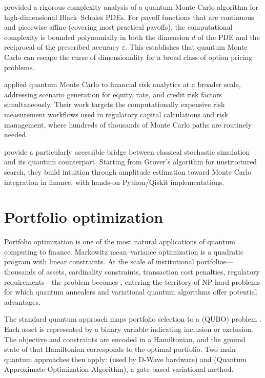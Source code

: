 \citet{chen_quantum_2025} provided a rigorous complexity analysis of a quantum Monte Carlo algorithm for high-dimensional Black--Scholes PDEs. For payoff functions that are continuous and piecewise affine (covering most practical payoffs), the computational complexity is bounded polynomially in both the dimension $d$ of the PDE and the reciprocal of the prescribed accuracy $\varepsilon$. This establishes that quantum Monte Carlo can escape the curse of dimensionality for a broad class of option pricing problems.

\citet{matsakos_quantum_2024} applied quantum Monte Carlo to financial risk analytics at a broader scale, addressing scenario generation for equity, rate, and credit risk factors simultaneously. Their work targets the computationally expensive risk measurement workflows used in regulatory capital calculations and risk management, where hundreds of thousands of Monte Carlo paths are routinely needed.

\citet{blanchet_connecting_2025} provide a particularly accessible bridge between classical stochastic simulation and its quantum counterpart. Starting from Grover's algorithm for unstructured search, they build intuition through amplitude estimation toward Monte Carlo integration in finance, with hands-on Python/Qiskit implementations.

\section{Portfolio optimization}

Portfolio optimization is one of the most natural applications of quantum computing to finance. Markowitz mean--variance optimization is a quadratic program with linear constraints. At the scale of institutional portfolios---thousands of assets, cardinality constraints, transaction cost penalties, regulatory requirements---the problem becomes , entering the territory of NP-hard problems for which quantum annealers and variational quantum algorithms offer potential advantages.

The standard quantum approach maps portfolio selection to a  (QUBO) problem \citep{orus_quantum_2019,egger_quantum_2020}. Each asset is represented by a binary variable indicating inclusion or exclusion. The objective and constraints are encoded in a Hamiltonian, and the ground state of that Hamiltonian corresponds to the optimal portfolio. Two main quantum approaches then apply:  (used by D-Wave hardware) and  (Quantum Approximate Optimization Algorithm), a gate-based variational method.

